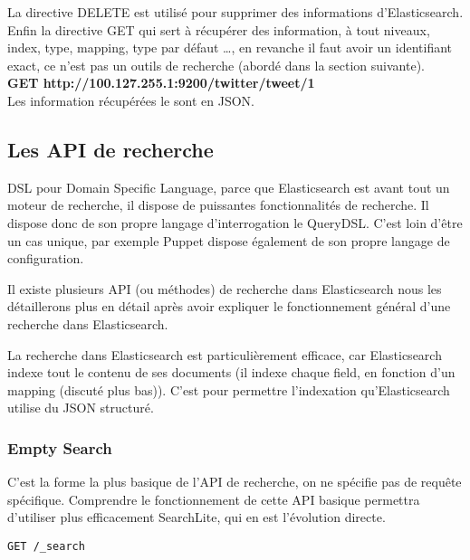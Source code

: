 La directive DELETE est utilisé pour supprimer des informations d'Elasticsearch.\\


Enfin la directive GET qui sert à récupérer des information, à tout niveaux, index,
type, mapping, type par défaut \ldots, en revanche il faut avoir un identifiant exact,
ce n'est pas un outils de recherche (abordé dans la section suivante).\\[5mm]
\textbf{GET  {\color{grey} http://100.127.255.1:9200}/{\color{red}twitter}/{\color{cyan}tweet}/{\color{yellow}1}}\\

Les information récupérées le sont en JSON.

\subsection{Les API de recherche}
DSL pour Domain Specific Language, parce que Elasticsearch est avant tout un moteur 
de recherche, il dispose de puissantes fonctionnalités de recherche. Il dispose donc
de son propre langage d'interrogation le QueryDSL. C'est loin d'être un cas unique,
par exemple Puppet dispose également de son propre langage de configuration.

Il existe plusieurs API (ou méthodes) de recherche dans Elasticsearch nous les  
détaillerons plus en détail après avoir expliquer le fonctionnement général d'une
recherche dans Elasticsearch.

La recherche dans Elasticsearch est particulièrement efficace, car Elasticsearch 
indexe tout le contenu de ses documents (il indexe chaque field, en fonction d'un
mapping (discuté plus bas)).
C'est pour permettre l'indexation qu'Elasticsearch utilise du JSON structuré.



\subsubsection{Empty Search}
C'est la forme la plus basique de l'API de recherche, on ne spécifie pas de requête
spécifique. Comprendre le fonctionnement de cette API basique permettra d'utiliser
plus efficacement SearchLite, qui en est l'évolution directe.


\begin{lstlisting}[style=code,label={lst:APIsearchemptyexample1},caption={le "Hello World" de la recherche}]
GET /_search
\end{lstlisting}

